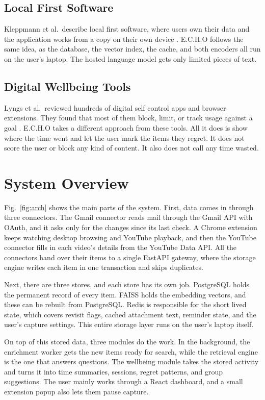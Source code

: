 \documentclass[conference]{IEEEtran}
\begin{document}
\subsection{Local First Software}
Kleppmann et al.\ describe local first software, where users own their data and the application works from a copy on their own device \cite{b12}. E.C.H.O follows the same idea, as the database, the vector index, the cache, and both encoders all run on the user's laptop. The hosted language model gets only limited pieces of text.

\subsection{Digital Wellbeing Tools}
Lyngs et al.\ reviewed hundreds of digital self control apps and browser extensions. They found that most of them block, limit, or track usage against a goal \cite{b14}. E.C.H.O takes a different approach from these tools. All it does is show where the time went and let the user mark the items they regret. It does not score the user or block any kind of content. It also does not call any time wasted.

\section{System Overview}\label{sec:overview}
Fig.~\ref{fig:arch} shows the main parts of the system. First, data comes in through three connectors. The Gmail connector reads mail through the Gmail API with OAuth, and it asks only for the changes since its last check. A Chrome extension keeps watching desktop browsing and YouTube playback, and then the YouTube connector fills in each video's details from the YouTube Data API. All the connectors hand over their items to a single FastAPI gateway, where the storage engine writes each item in one transaction and skips duplicates.

Next, there are three stores, and each store has its own job. PostgreSQL holds the permanent record of every item. FAISS holds the embedding vectors, and these can be rebuilt from PostgreSQL. Redis is responsible for the short lived state, which covers revisit flags, cached attachment text, reminder state, and the user's capture settings. This entire storage layer runs on the user's laptop itself.

On top of this stored data, three modules do the work. In the background, the enrichment worker gets the new items ready for search, while the retrieval engine is the one that answers questions. The wellbeing module takes the stored activity and turns it into time summaries, sessions, regret patterns, and group suggestions. The user mainly works through a React dashboard, and a small extension popup also lets them pause capture.
\end{document}
